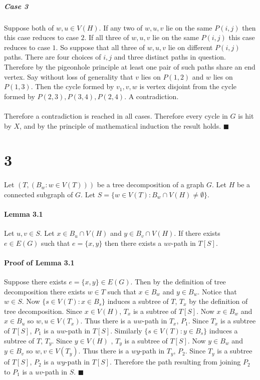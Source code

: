 \documentclass[letterpaper,12pt,oneside,onecolumn]{report}
\begin{document}
\subparagraph{Case 3}
Suppose both of $w,u \in V(H)$. If any two of $w,u,v$ lie on the same $P(i,j)$ then this case reduces to case $2$. If all three of $w,u,v$ lie on the same $P(i,j)$ this case reduces to case $1$. So suppose that all three of $w,u,v$ lie on different $P(i,j)$ paths. There are four choices of $i,j$ and three distinct paths in question. Therefore by the pigeonhole principle at least one pair of such paths share an end vertex. Say without loss of generality that $v$ lies on $P(1,2)$ and $w$ lies on $P(1,3)$. Then the cycle formed by $v_1,v,w$ is vertex disjoint from the cycle formed by $P(2,3),P(3,4),P(2,4)$. A contradiction.
\paragraph{}
Therefore a contradiction is reached in all cases.  Therefore every cycle in $G$ is hit by $X$, and by the principle of mathematical induction the result holds. $\blacksquare$
\section*{3}
\paragraph{}
Let $(T,(B_w : w\in V(T)))$ be a tree decomposition of a graph $G$. Let $H$ be a connected subgraph of $G$. Let $S = \{w \in V(T) : B_w \cap V(H) \neq \emptyset \}$.
\paragraph{Lemma 3.1}
Let $u, v \in S$. Let $x \in B_u \cap V(H)$ and $y \in B_v \cap V(H)$. If there exists $e \in E(G)$ such that $e = \{x,y\}$ then there exists a $uv$-path in $T[S]$.
\paragraph{Proof of Lemma 3.1}
Suppose there exists $e=\{x,y\} \in E(G)$. Then by the definition of tree decomposition there exists $w \in T$ such that $x \in B_w$ and $y \in B_w$. Notice that $w \in S$. Now $\{ s \in V(T) : x \in B_s \}$ induces a subtree of $T$, $T_x$ by the definition of tree decomposition. Since $x \in V(H)$, $T_x$ is a subtree of $T[S]$. Now $x \in B_w$ and $x \in B_u$ so $w,u \in V(T_x)$. Thus there is a $uw$-path in $T_x$, $P_1$. Since $T_x$ is a subtree of $T[S]$, $P_1$ is a $uw$-path in $T[S]$. Similarly $\{s \in V(T) : y \in B_s \}$ induces a subtree of $T$, $T_y$. Since $y \in V(H)$ , $T_y$ is a subtree of $T[S]$. Now $y \in B_w$ and $y \in B_v$ so $w,v \in V(T_y)$. Thus there is a $wy$-path in $T_y$, $P_2$. Since $T_y$ is a subtree of $T[S]$, $P_2$ is a $wy$-path in $T[S]$. Therefore the path resulting from joining $P_2$ to $P_1$ is a $uv$-path in $S$. $\blacksquare$
\end{document}
